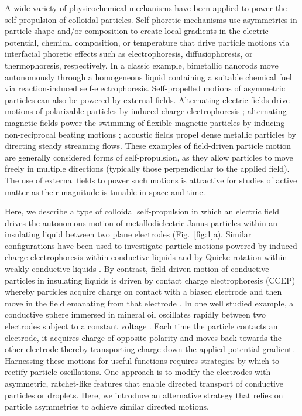 A wide variety of physicochemical mechanisms have been applied to power the self-propulsion of colloidal particles.
Self-phoretic mechanisms\cite{Golestanian2007} use asymmetries in particle shape and/or composition to create local gradients in the electric potential\cite{Brown2014}, chemical composition\cite{Howse2007}, or temperature\cite{Jiang2010} that drive particle motions via interfacial phoretic effects such as electrophoresis, diffusiophoresis, or thermophoresis, respectively\cite{Anderson1989}.
In a classic example\cite{Paxton2004,Fournier-Bidoz2005}, bimetallic nanorods move autonomously through a homogeneous liquid containing a suitable chemical fuel via reaction-induced  self-electrophoresis\cite{Wang2006,Moran2010}. 
Self-propelled motions of asymmetric particles can also be powered by external fields.
Alternating electric fields drive motions of polarizable particles by induced charge electrophoresis \cite{Squires2006,Gangwal2008,Boymelgreen2014}; alternating magnetic fields power the swimming of flexible magnetic particles by inducing non-reciprocal beating motions \cite{Dreyfus2005}; acoustic fields propel dense metallic particles by directing steady streaming flows\cite{Wang2012,Nadal2014,Ahmed2015}. 
These examples of field-driven particle motion are generally considered forms of self-propulsion, as they allow particles to move freely in multiple directions (typically those perpendicular to the applied field).
The use of external fields to power such motions is attractive for studies of active matter as their magnitude is tunable in space and time.

Here, we describe a type of colloidal self-propulsion in which an electric field drives the autonomous motion of metallodielectric Janus particles\cite{Perro2005,Pawar2008} within an insulating liquid between two plane electrodes (Fig.~\ref{fig:1}a).
Similar configurations have been used to investigate particle motions powered by induced charge electrophoresis within conductive liquids\cite{Boymelgreen2014} and by Quicke rotation within weakly conductive liquids \cite{Bricard2013}.
By contrast, field-driven  motion of conductive particles in insulating liquids is driven by contact charge electrophoresis (CCEP) whereby particles acquire charge on contact with a biased electrode and then move in the field emanating from that electrode \cite{drews2013ratcheted,cartier2014microfluidic,drews2015contact}.
In one well studied example, a conductive sphere immersed in mineral oil oscillates rapidly between two electrodes subject to a constant voltage \cite{drews2015contact}.
Each time the particle contacts an electrode, it acquires charge of opposite polarity and moves back towards the other electrode thereby transporting charge down the applied potential gradient.
Harnessing these motions for useful functions requires strategies by which to rectify particle oscillations.
One approach is to modify the electrodes with asymmetric, ratchet-like features that enable directed transport of conductive particles\cite{drews2013ratcheted} or droplets\cite{Um2016}.
Here, we introduce an alternative strategy that relies on particle asymmetries to achieve similar directed motions.

